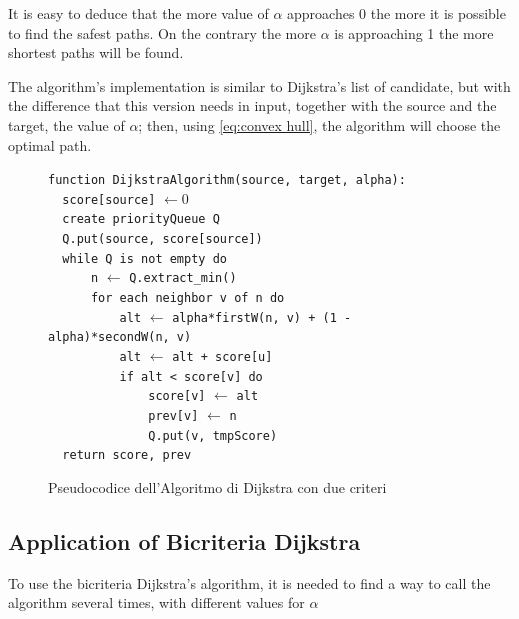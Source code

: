 \documentclass[a4paper,11pt]{report}
\begin{document}
It is easy to deduce that the more value of $\alpha$ approaches $0$ the more it is possible to find the safest paths. On the contrary the more $\alpha$ is approaching 1 the more shortest paths will be found.

\vspace{5mm}

The algorithm's implementation is similar to Dijkstra's list of candidate, but with the difference that this version needs in input, together with the source and the target, the value of $\alpha$; then, using \eqref{eq:convex hull}, the algorithm will choose the optimal path.

\begin{figure}[h]
	\verb|function DijkstraAlgorithm(source, target, alpha):|\\
	\verb|	score[source]| $\leftarrow 0$\\
	\verb|	create priorityQueue Q|\\
	\verb|	Q.put(source, score[source])|\\
	\verb|	while Q is not empty do|\\
	\verb|	    n| $\leftarrow$ \verb|Q.extract_min()|\\
	\verb|	    for each neighbor v of n do|\\
	\verb|	        alt| $\leftarrow$ \verb|alpha*firstW(n, v) + (1 - alpha)*secondW(n, v)|\\
	\verb|	        alt| $\leftarrow$ \verb|alt + score[u]|\\
	\verb|	        if alt < score[v] do|\\
	\verb|	            score[v]| $\leftarrow$ \verb|alt|\\
	\verb|	            prev[v]| $\leftarrow$ \verb|n|\\
	\verb|	            Q.put(v, tmpScore)|\\
	\verb|	return score, prev|\\
	\caption{Pseudocodice dell'Algoritmo di Dijkstra con due criteri}
	\label{fig:Dijkstra Bicrit}
\end{figure}

\subsection{Application of Bicriteria Dijkstra}
To use the bicriteria Dijkstra's algorithm, it is needed to find a way to call the algorithm several times, with different values for $\alpha$
\end{document}
